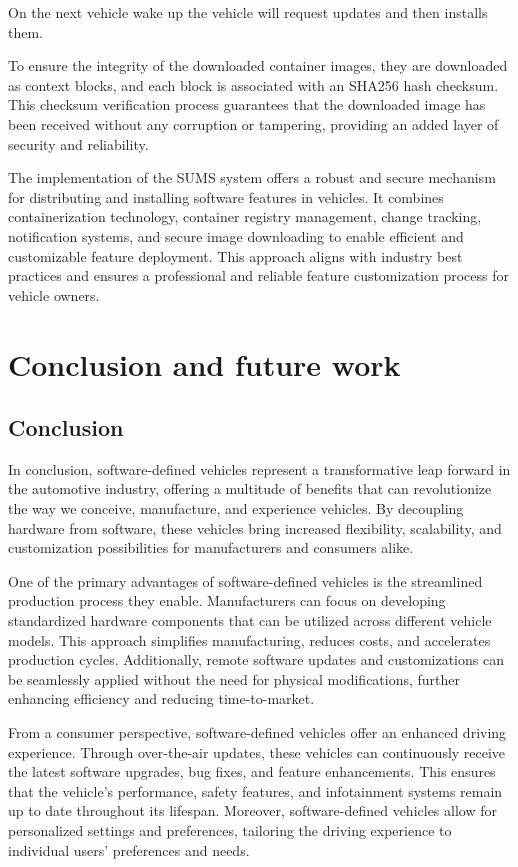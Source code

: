\documentclass[
12pt,
oneside, 
onehalfspacing, 
nolistspacing, 
parskip, 
chapterinoneline, 
]{AASTCOMPUTER}
\begin{document}
On the next vehicle wake up the vehicle will request updates and then installs them.

To ensure the integrity of the downloaded container images, they are downloaded as context blocks, and each block is associated with an SHA256 hash checksum. This checksum verification process guarantees that the downloaded image has been received without any corruption or tampering, providing an added layer of security and reliability.

The implementation of the SUMS system offers a robust and secure mechanism for distributing and installing software features in vehicles. It combines containerization technology, container registry management, change tracking, notification systems, and secure image downloading to enable efficient and customizable feature deployment. This approach aligns with industry best practices and ensures a professional and reliable feature customization process for vehicle owners.

\chapter{Conclusion and future work}
\section{Conclusion}
In conclusion, software-defined vehicles represent a transformative leap forward in the automotive industry, offering a multitude of benefits that can revolutionize the way we conceive, manufacture, and experience vehicles. By decoupling hardware from software, these vehicles bring increased flexibility, scalability, and customization possibilities for manufacturers and consumers alike.

One of the primary advantages of software-defined vehicles is the streamlined production process they enable. Manufacturers can focus on developing standardized hardware components that can be utilized across different vehicle models. This approach simplifies manufacturing, reduces costs, and accelerates production cycles. Additionally, remote software updates and customizations can be seamlessly applied without the need for physical modifications, further enhancing efficiency and reducing time-to-market.

From a consumer perspective, software-defined vehicles offer an enhanced driving experience. Through over-the-air updates, these vehicles can continuously receive the latest software upgrades, bug fixes, and feature enhancements. This ensures that the vehicle's performance, safety features, and infotainment systems remain up to date throughout its lifespan. Moreover, software-defined vehicles allow for personalized settings and preferences, tailoring the driving experience to individual users' preferences and needs.
\end{document}
